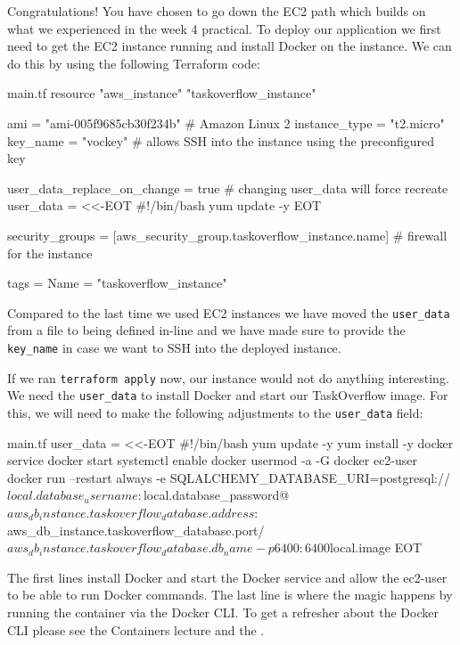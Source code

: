 \documentclass{csse4400}
\begin{document}
Congratulations! You have chosen to go down the EC2 path which builds on what we experienced in the week 4 practical.
To deploy our application we first need to get the EC2 instance running and install Docker on the instance.
We can do this by using the following Terraform code:

\begin{code}[language=terraform,numbers=none]{main.tf}
resource "aws_instance" "taskoverflow_instance" {
    ami           = "ami-005f9685cb30f234b" # Amazon Linux 2
    instance_type = "t2.micro"
    key_name      = "vockey" # allows SSH into the instance using the preconfigured key
    
    user_data_replace_on_change = true # changing user_data will force recreate
    user_data                   = <<-EOT
#!/bin/bash
yum update -y
    EOT
  
    security_groups = [aws_security_group.taskoverflow_instance.name] # firewall for the instance

    tags = {
        Name = "taskoverflow_instance"
    }
}
\end{code}

Compared to the last time we used EC2 instances we have moved the \texttt{user\_data} from a file to being defined in-line and we have made sure to provide the \texttt{key\_name} in case we want to SSH into the deployed instance.

If we ran \texttt{terraform apply} now, our instance would not do anything interesting.
We need the \texttt{user\_data} to install Docker and start our TaskOverflow image.
For this, we will need to make the following adjustments to the \texttt{user\_data} field:


\begin{code}[language=terraform,numbers=none]{main.tf}
  user_data = <<-EOT
#!/bin/bash
yum update -y
yum install -y docker
service docker start
systemctl enable docker
usermod -a -G docker ec2-user 
docker run --restart always -e SQLALCHEMY_DATABASE_URI=postgresql://${local.database_username}:${local.database_password}@${aws_db_instance.taskoverflow_database.address}:${aws_db_instance.taskoverflow_database.port}/${aws_db_instance.taskoverflow_database.db_name} -p 6400:6400 ${local.image}
  EOT
\end{code}

The first lines install Docker and start the Docker service and allow the ec2-user to be able to run Docker commands.
The last line is where the magic happens by running the container via the Docker CLI.
To get a refresher about the Docker CLI please see the Containers lecture \cite{container-slides} and the . 
\end{document}
